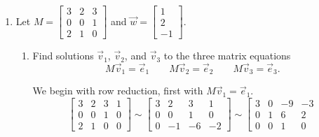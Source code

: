 \documentclass[letter]{article}
\newcommand{\mat}[1]{\begin{bmatrix}#1\end{bmatrix}}
\newenvironment{answer}{
	\begin{adjustwidth}{8mm}{} \vspace{2mm}}{\end{adjustwidth} \vspace{2mm}
}
\theoremstyle{plain}
\theoremstyle{definition}
\theoremstyle{remark}
\begin{document}
\begin{enumerate}
\begin{enumerate}
\begin{answer}
\[					\]
					Therefore, we have that the set of solutions to the homogeneous system given in vector form is
					\[
					\mat{x_1\\x_2\\x_3\\x_4\\x_5} = x_3\mat{-1\\-1\\1\\0\\0} + x_4\mat{-2\\0\\0\\1\\0}.
					\]
					The solution set of the homogeneous system is the solution set of the original system translated by the vector
					\[
					\mat{-1\\3\\0\\0\\4}.
					\]
				\end{answer}
			\end{enumerate}
		\item Let $M=\mat{3&2&3\\0&0&1\\2&1&0}$ and $\vec w=\mat{1\\2\\-1}$.
			\begin{enumerate}
				\item Find solutions $\vec v_1$, $\vec v_2$, and $\vec v_3$ to the three matrix
					equations
					\[
						M\vec v_1=\vec e_1\qquad M\vec v_2=\vec e_2\qquad M\vec v_3=\vec e_3.
					\]
				\begin{answer}
					We begin with row reduction, first with $M\vec{v}_1 = \vec{e}_1$.
					\[
					\left[\begin{array}{ccc|c}
					3 & 2 & 3 & 1 \\
					0 & 0 & 1 & 0 \\
					2 & 1 & 0 & 0
					\end{array}\right] \sim
					\left[\begin{array}{ccc|c}
					3 & 2 & 3 & 1 \\
					0 & 0 & 1 & 0 \\
					0 & -1 & -6 & -2
					\end{array}\right] \sim
					\left[\begin{array}{ccc|c}
					3 & 0 & -9 & -3 \\
					0 & 1 & 6 & 2 \\
					0 & 0 & 1 & 0

\end{array}\]
\end{answer}
\end{enumerate}
\end{enumerate}
\end{document}
